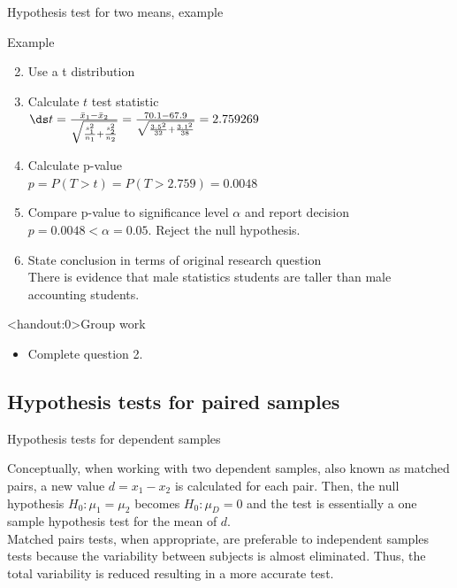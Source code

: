 \documentclass[xcolor=table, aspectratio=169, bigger, handout]{beamer}
\begin{document}
\begin{frame}{Hypothesis test for two means, example}
\begin{exampleblock}{Example}
\begin{enumerate}
\setcounter{enumi}{1}

\item Use a t distribution
\pause\item Calculate $t$ test statistic\\ \medskip
\pause$\ds t = \frac {\bar x_1 - \bar x_2}{\sqrt{\frac{s_1^2}{n_1} + \frac{s_2^2}{n_2}}} = \frac {70.1 - 67.9}{\sqrt{\frac{3.5^2}{32} + \frac{3.1^2}{38}}} = 2.759269$
\pause\item Calculate p-value\\
\pause$p = P(T > t) = P(T > 2.759) = 0.0048$
\pause\item Compare p-value to significance level $\alpha$ and report decision\\
\pause$p = 0.0048 < \alpha = 0.05$. Reject the null hypothesis.
\pause\item State conclusion in terms of original research question\\
\pause There is evidence that male statistics students are taller than male accounting students.
\end{enumerate}

\end{exampleblock}
\end{frame}

\begin{frame}<handout:0>{Group work}
\begin{block}{}
\large
\begin{itemize}
\item Complete question 2.
\end{itemize}
\end{block}
\end{frame}

%
%
\subsection{Hypothesis tests for paired samples}


\begin{frame}{Hypothesis tests for dependent samples}
\begin{block}{}
Conceptually, when working with two dependent samples, also known as matched pairs, a new value $d = x_1 - x_2$ is calculated for each pair. Then, the null hypothesis $H_0: \mu_1 = \mu_2$ becomes $H_0: \mu_D = 0$ and the test is essentially a one sample hypothesis test for the mean of $d$.\\
\pause\medskip
Matched pairs tests, when appropriate, are preferable to independent samples tests because the variability between subjects is almost eliminated. Thus, the total variability is reduced resulting in a more accurate test. 
\end{block}
\end{frame}
\end{document}
